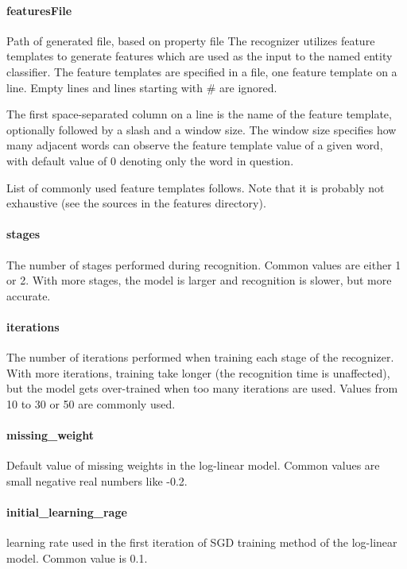 \documentclass[12pt,a4paper]{report}
\begin{document}
\paragraph{featuresFile}
Path of generated file, based on property file 
The recognizer utilizes feature templates to generate features which are used as the input to the named entity classifier. The feature templates are specified in a file, one feature template on a line. Empty lines and lines starting with \# are ignored.

The first space-separated column on a line is the name of the feature template, optionally followed by a slash and a window size. The window size specifies how many adjacent words can observe the feature template value of a given word, with default value of 0 denoting only the word in question.

List of commonly used feature templates follows. Note that it is probably not exhaustive (see the sources in the features directory).

\paragraph{stages}
The number of stages performed during recognition. Common values are either 1 or 2. With more stages, the model is larger and recognition is slower, but more accurate.

\paragraph{iterations}
The number of iterations performed when training each stage of the recognizer. With more iterations, training take longer (the recognition time is unaffected), but the model gets over-trained when too many iterations are used. Values from 10 to 30 or 50 are commonly used.

\paragraph{missing\_weight}
Default value of missing weights in the log-linear model. Common values are small negative real numbers like -0.2.

\paragraph{initial\_learning\_rage}
learning rate used in the first iteration of SGD training method of the log-linear model. Common value is 0.1.
\end{document}
